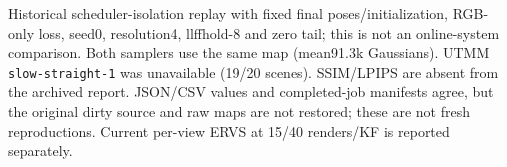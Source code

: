 \begin{table}[tbp]
\centering
\caption{Original interval-sampling comparison: archived fixed-topology 3DGS replay measurements. Equal scene-weighted PSNR over 19 available scenes.}
\label{tab:order}
\begingroup
\footnotesize
\setlength{\tabcolsep}{3pt}
\endgroup
\par\vspace{3pt}
\begin{minipage}{\linewidth}
\scriptsize\raggedright Historical scheduler-isolation replay with fixed final poses/initialization, RGB-only loss, seed0, resolution4, llffhold-8 and zero tail; this is not an online-system comparison. Both samplers use the same map (mean91.3k Gaussians). UTMM \texttt{slow-straight-1} was unavailable (19/20 scenes). SSIM/LPIPS are absent from the archived report. JSON/CSV values and completed-job manifests agree, but the original dirty source and raw maps are not restored; these are not fresh reproductions. Current per-view ERVS at 15/40 renders/KF is reported separately.
\end{minipage}
\end{table}
